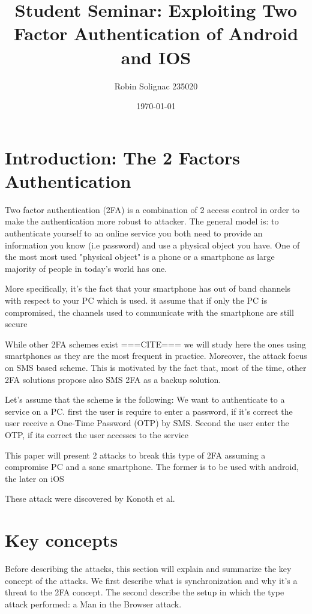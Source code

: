 \documentclass[11pt, a4paper,twocolumn]{article}
\title{Student Seminar: Exploiting Two Factor Authentication of Android and IOS}
\author{Robin Solignac 235020}
\date{\today}
\begin{document}
\maketitle

\section{Introduction: The 2 Factors Authentication}

Two factor authentication (2FA) is a combination of 2 access control  in order to make the authentication more robust to attacker. The general model is: to authenticate yourself to an online service you both need to provide an information you know (i.e password) and use a physical object you have. 
One of the most most used "physical object" is a phone or a smartphone as large majority of people in today's world has one.

More specifically, it's the fact that your smartphone has out of band channels with respect to your PC which is used. it assume that if only the PC is compromised, the channels used to communicate with the smartphone are still secure

While other 2FA schemes exist ===CITE=== we will study here the ones using smartphones as they are the most frequent in practice. Moreover, the attack focus on SMS based scheme.
This is motivated by the fact that, most of the time, other 2FA solutions  propose also SMS 2FA as a backup solution.

Let's assume that the scheme is the following: We want to authenticate to a service on a PC. first the user is require to enter a password, if it's correct the user receive a One-Time Password (OTP) by SMS. Second the user enter the OTP, if its correct the user accesses to the service

This paper will present 2 attacks to break this type of 2FA assuming a compromise PC and a sane smartphone. The former is to be used with android, the later on iOS

These attack were discovered by Konoth et al. \cite{Base}

\section{Key concepts}
Before describing the attacks, this section will explain and summarize the key concept of the attacks. We first describe what is synchronization and why it's a threat to the 2FA concept. The second describe the setup in which the type attack performed: a Man in the Browser attack.
\end{document}
